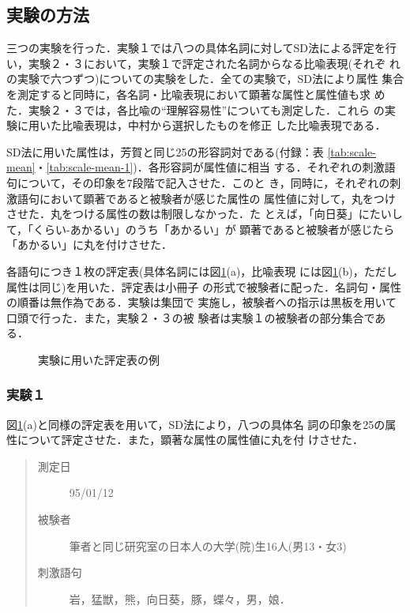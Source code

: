 \subsection{実験の方法}
\label{sec:method}
三つの実験を行った．実験１では八つの具体名詞に対してSD法による評定を行
い，実験２・３において，実験１で評定された名詞からなる比喩表現(それぞ
れの実験で六つずつ)についての実験をした．全ての実験で，SD法により属性
集合を測定すると同時に，各名詞・比喩表現において顕著な属性と属性値も求
めた．実験２・３では，各比喩の``理解容易性''についても測定した．これら
の実験に用いた比喩表現は，中村\cite{Nakamura77b}から選択したものを修正
した比喩表現である．

SD法に用いた属性は，芳賀\cite{Haga90}と同じ25の形容詞対である(付録：表
\ref{tab:scale-mean}・\ref{tab:scale-mean-1})．各形容詞が属性値に相当
する．それぞれの刺激語句について，その印象を7段階で記入させた．このと
き，同時に，それぞれの刺激語句において顕著であると被験者が感じた属性の
属性値に対して，丸をつけさせた．丸をつける属性の数は制限しなかった．た
とえば，「向日葵」にたいして，「くらい-あかるい」のうち「あかるい」が
顕著であると被験者が感じたら「あかるい」に丸を付けさせた．

各語句につき１枚の評定表(具体名詞には図\ref{fig:sd-card}(a)，比喩表現
には図\ref{fig:sd-card}(b)，ただし属性は同じ)を用いた．評定表は小冊子
の形式で被験者に配った．名詞句・属性の順番は無作為である．実験は集団で
実施し，被験者への指示は黒板を用いて口頭で行った．また，実験２・３の被
験者は実験１の被験者の部分集合である．

\begin{figure}[htbp]
  \begin{center}
    \leavevmode
  \end{center}
  \caption{実験に用いた評定表の例}
  \label{fig:sd-card}
\end{figure}

\subsubsection{実験１} 
図\ref{fig:sd-card}(a)と同様の評定表を用いて，SD法により，八つの具体名
詞の印象を25の属性について評定させた．また，顕著な属性の属性値に丸を付
けさせた．
\begin{quote}
  \begin{description}
  \item[測定日\hspace{1em}] 95/01/12
  \item[被験者\hspace{1em}] 筆者と同じ研究室の日本人の大学(院)生16人(男13・女3)
  \item[刺激語句] 岩，猛獣，熊，向日葵，豚，蝶々，男，娘．
  \end{description}  
\end{quote}

